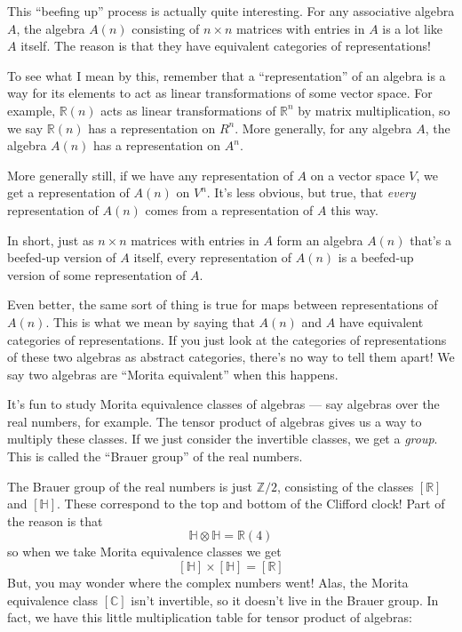 \documentclass{article}
\begin{document}
This ``beefing up'' process is actually quite interesting. For any
associative algebra \(A\), the algebra \(A(n)\) consisting of
\(n \times n\) matrices with entries in \(A\) is a lot like \(A\)
itself. The reason is that they have equivalent categories of
representations!

To see what I mean by this, remember that a ``representation'' of an
algebra is a way for its elements to act as linear transformations of
some vector space. For example, \(\mathbb{R}(n)\) acts as linear
transformations of \(\mathbb{R}^n\) by matrix multiplication, so we say
\(\mathbb{R}(n)\) has a representation on \(R^n\). More generally, for
any algebra \(A\), the algebra \(A(n)\) has a representation on \(A^n\).

More generally still, if we have any representation of \(A\) on a vector
space \(V\), we get a representation of \(A(n)\) on \(V^n\). It's less
obvious, but true, that \emph{every} representation of \(A(n)\) comes
from a representation of \(A\) this way.

In short, just as \(n \times n\) matrices with entries in \(A\) form an
algebra \(A(n)\) that's a beefed-up version of \(A\) itself, every
representation of \(A(n)\) is a beefed-up version of some representation
of \(A\).

Even better, the same sort of thing is true for maps between
representations of \(A(n)\). This is what we mean by saying that
\(A(n)\) and \(A\) have equivalent categories of representations. If you
just look at the categories of representations of these two algebras as
abstract categories, there's no way to tell them apart! We say two
algebras are ``Morita equivalent'' when this happens.

It's fun to study Morita equivalence classes of algebras --- say
algebras over the real numbers, for example. The tensor product of
algebras gives us a way to multiply these classes. If we just consider
the invertible classes, we get a \emph{group}. This is called the
``Brauer group'' of the real numbers.

The Brauer group of the real numbers is just \(\mathbb{Z}/2\),
consisting of the classes \([\mathbb{R}]\) and \([\mathbb{H}]\). These
correspond to the top and bottom of the Clifford clock! Part of the
reason is that \[\mathbb{H}\otimes\mathbb{H} = \mathbb{R}(4)\] so when
we take Morita equivalence classes we get
\[[\mathbb{H}]\times[\mathbb{H}] = [\mathbb{R}]\] But, you may wonder
where the complex numbers went! Alas, the Morita equivalence class
\([\mathbb{C}]\) isn't invertible, so it doesn't live in the Brauer
group. In fact, we have this little multiplication table for tensor
product of algebras:
\end{document}
